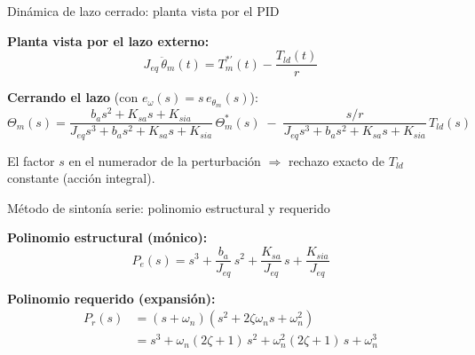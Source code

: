 \documentclass[aspectratio=169,t]{beamer}
\begin{document}
\begin{frame}{Dinámica de lazo cerrado: planta vista por el PID}
\vspace{3mm}

\textbf{Planta vista por el lazo externo:}
\begin{equation*}
J_{eq}\,\ddot{\theta}_m(t) = T_m^{*\prime}(t) - \frac{T_{ld}(t)}{r}
\end{equation*}

\textbf{Cerrando el lazo} (con $e_\omega(s)=s\,e_{\theta_m}(s)$):
\begin{equation*}
\Theta_m(s)=\frac{b_as^2 + K_{sa}s+K_{sia}}{J_{eq}s^3+b_as^2 + K_{sa}s+K_{sia}}\,\Theta_m^{\ast}(s)
\;-\;\frac{s/r}{J_{eq}s^3+b_as^2 + K_{sa}s+K_{sia}}\,T_{ld}(s)
\end{equation*}

\vspace{2mm}
{\small El factor $s$ en el numerador de la perturbación $\Rightarrow$ rechazo exacto de $T_{ld}$ constante (acción integral).}
\end{frame}

\begin{frame}{Método de sintonía serie: polinomio estructural y requerido}
\vspace{3mm}

\textbf{Polinomio estructural (mónico):}
\begin{equation*}
P_e(s) = s^{3} + \frac{b_a}{J_{eq}}\,s^{2} + \frac{K_{sa}}{J_{eq}}\,s + \frac{K_{sia}}{J_{eq}}
\end{equation*}

\vspace{2mm}
\textbf{Polinomio requerido (expansión):}
\begin{align*}
P_r(s) &= (s+\omega_n)\left(s^2 + 2\zeta\omega_n s + \omega_n^2\right)\\[2pt]
&= s^3 + \omega_n(2\zeta+1)\,s^2 + \omega_n^2(2\zeta+1)\,s + \omega_n^3
\end{align*}
\end{frame}
\end{document}
